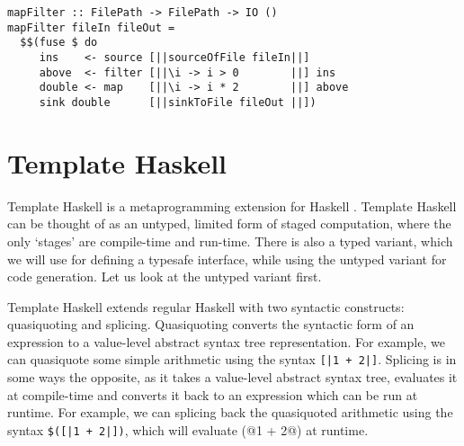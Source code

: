 \begin{lstlisting}
mapFilter :: FilePath -> FilePath -> IO ()
mapFilter fileIn fileOut =
  $$(fuse $ do
     ins    <- source [||sourceOfFile fileIn||]
     above  <- filter [||\i -> i > 0        ||] ins
     double <- map    [||\i -> i * 2        ||] above
     sink double      [||sinkToFile fileOut ||])
\end{lstlisting}

% 
% 
% 

\section{Template Haskell}
Template Haskell is a metaprogramming extension for Haskell \cite{sheard2002template}.
Template Haskell can be thought of as an untyped, limited form of staged computation, where the only `stages' are compile-time and run-time.
There is also a typed variant, which we will use for defining a typesafe interface, while using the untyped variant for code generation.
Let us look at the untyped variant first.

Template Haskell extends regular Haskell with two syntactic constructs: quasiquoting and splicing.
Quasiquoting converts the syntactic form of an expression to a value-level abstract syntax tree representation.
For example, we can quasiquote some simple arithmetic using the syntax \lstinline/[|1 + 2|]/.
Splicing is in some ways the opposite, as it takes a value-level abstract syntax tree, evaluates it at compile-time and converts it back to an expression which can be run at runtime.
For example, we can splicing back the quasiquoted arithmetic using the syntax \lstinline/$([|1 + 2|])/, which will evaluate (@1 + 2@) at runtime.

